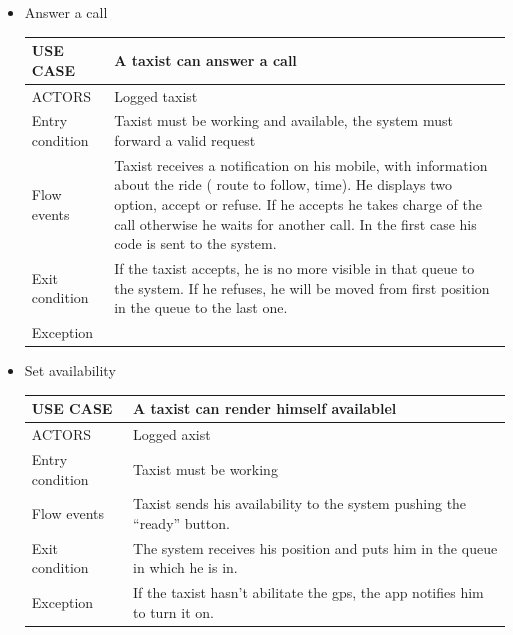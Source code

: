 \begin{itemize}
\newpage

\item Answer a call
	\begin{center}
   	 \begin{tabular}{ | l | p{11cm} |}
   	 \hline
   	USE CASE & A taxist can answer a call\\ \hline
   	 ACTORS & Logged taxist \\ \hline
    	 Entry condition & Taxist must be working and available, the system must forward a valid request \\ \hline
    	 Flow events & Taxist receives a notification on his mobile, with information about the ride ( route to follow, time).
He displays two option, accept or refuse. If he accepts he takes charge of the call otherwise he waits for another call. In the first case his code is sent to the system.\\ \hline
  	   Exit condition & If the taxist accepts, he is no more visible in that queue to the system.
If he refuses, he will be moved from first position in the queue to the last one.\\ \hline
  	   Exception &  \\ \hline
    \end{tabular}
\end{center}
\item Set availability
	\begin{center}
   	 \begin{tabular}{ | l | p{11cm} |}
   	 \hline
   	USE CASE & A taxist can render himself availablel\\ \hline
   	 ACTORS & Logged axist \\ \hline
    	 Entry condition & Taxist must be working \\ \hline
    	 Flow events & Taxist sends his availability to the system pushing the “ready” button.\\ \hline
  	   Exit condition & The system receives his position and puts him in the queue in which he is in.\\ \hline
  	   Exception &  If the taxist hasn’t abilitate the gps, the app notifies him to turn it on.\\ \hline
    \end{tabular}
\end{center}


\end{itemize}
